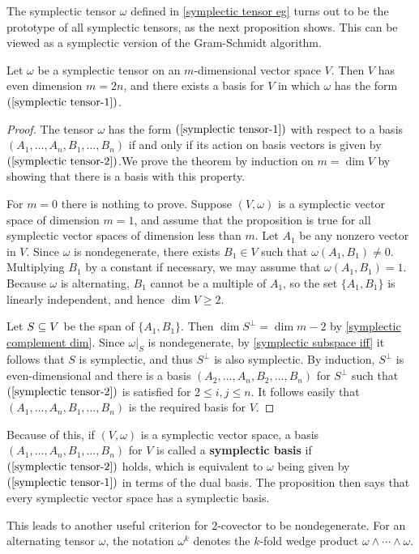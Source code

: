 The symplectic tensor $\omega$ defined in \cref{symplectic tensor eg} turns out to be the prototype of all symplectic tensors, as the next proposition shows. This can be viewed as a symplectic version of the Gram-Schmidt algorithm.

\begin{proposition}\label{symplectic tensor canonical form}
Let $\omega$ be a symplectic tensor on an $m$-dimensional vector space $V$. Then $V$ has even dimension $m=2n$, and there exists a basis for $V$ in which $\omega$ has the form $(\ref{symplectic tensor-1})$.
\end{proposition}
\begin{proof}
The tensor $\omega$ has the form $(\ref{symplectic tensor-1})$ with respect to a basis $(A_1,\dots,A_n,B_1,\dots,B_n)$ if and only if its action on basis vectors is given by $(\ref{symplectic tensor-2})$.We prove the theorem by induction on $m=\dim V$ by showing that there is a basis with this property.\par
For $m=0$ there is nothing to prove. Suppose $(V,\omega)$ is a symplectic vector space of dimension $m=1$, and assume that the proposition is true for all symplectic vector spaces of dimension less than $m$. Let $A_1$ be any nonzero vector in $V$. Since $\omega$ is nondegenerate, there exists $B_1\in V$ such that $\omega(A_1,B_1)\neq0$. Multiplying $B_1$ by a constant if necessary, we may assume that $\omega(A_1,B_1)=1$. Because $\omega$ is alternating, $B_1$ cannot be a multiple of $A_1$, so the set $\{A_1,B_1\}$ is linearly independent, and hence $\dim V\geq2$.\par
Let $S\subseteq V$ be the span of $\{A_1,B_1\}$. Then $\dim S^\bot=\dim m-2$ by \cref{symplectic complement dim}. Since $\omega|_S$ is nondegenerate, by \cref{symplectic subspace iff} it follows that $S$ is symplectic, and thus $S^\bot$ is also symplectic. By induction, $S^\bot$ is even-dimensional and there is a basis $(A_2,\dots,A_n,B_2,\dots,B_n)$ for $S^\bot$ such that $(\ref{symplectic tensor-2})$ is satisfied for $2\leq i,j\leq n$. It follows easily that $(A_1,\dots,A_n,B_1,\dots,B_n)$ is the required basis for $V$.
\end{proof}

Because of this, if $(V,\omega)$ is a symplectic vector space, a basis $(A_1,\dots,A_n,B_1,\dots,B_n)$ for $V$ is called a \textbf{symplectic basis} if $(\ref{symplectic tensor-2})$ holds, which is equivalent to $\omega$ being given by $(\ref{symplectic tensor-1})$ in terms of the dual basis. The proposition then says that every symplectic vector space has a symplectic basis.\par
This leads to another useful criterion for $2$-covector to be nondegenerate. For an alternating tensor $\omega$, the notation $\omega^k$ denotes the $k$-fold wedge product $\omega\wedge\cdots\wedge\omega$.

